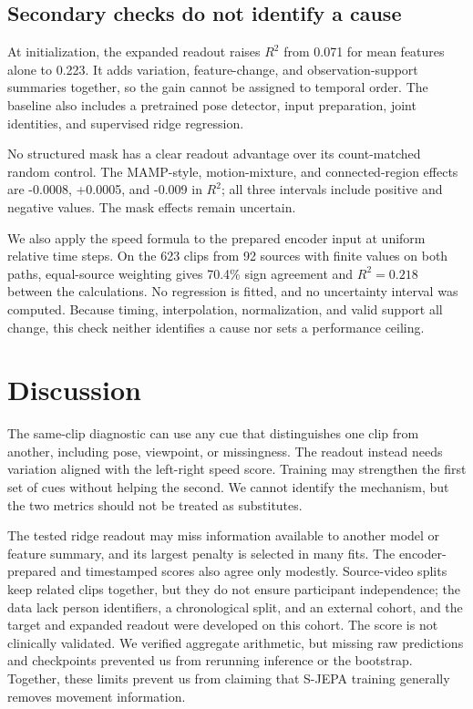 \documentclass{article}
\begin{document}
\subsection{Secondary checks do not identify a
cause}\label{secondary-checks-do-not-identify-a-cause}

At initialization, the expanded readout raises \(R^2\) from 0.071 for
mean features alone to 0.223. It adds variation, feature-change, and
observation-support summaries together, so the gain cannot be assigned
to temporal order. The baseline also includes a pretrained pose
detector, input preparation, joint identities, and supervised ridge
regression.

No structured mask has a clear readout advantage over its count-matched
random control. The MAMP-style, motion-mixture, and connected-region
effects are -0.0008, +0.0005, and -0.009 in \(R^2\); all three intervals
include positive and negative values. The mask effects remain uncertain.

We also apply the speed formula to the prepared encoder input at uniform
relative time steps. On the 623 clips from 92 sources with finite values
on both paths, equal-source weighting gives 70.4\% sign agreement and
\(R^2=0.218\) between the calculations. No regression is fitted, and no
uncertainty interval was computed. Because timing, interpolation,
normalization, and valid support all change, this check neither
identifies a cause nor sets a performance ceiling.

\section{Discussion}\label{discussion}

The same-clip diagnostic can use any cue that distinguishes one clip
from another, including pose, viewpoint, or missingness. The readout
instead needs variation aligned with the left-right speed score.
Training may strengthen the first set of cues without helping the
second. We cannot identify the mechanism, but the two metrics should not
be treated as substitutes.

The tested ridge readout may miss information available to another model
or feature summary, and its largest penalty is selected in many fits.
The encoder-prepared and timestamped scores also agree only modestly.
Source-video splits keep related clips together, but they do not ensure
participant independence; the data lack person identifiers, a
chronological split, and an external cohort, and the target and expanded
readout were developed on this cohort. The score is not clinically
validated. We verified aggregate arithmetic, but missing raw predictions
and checkpoints prevented us from rerunning inference or the bootstrap.
Together, these limits prevent us from claiming that S-JEPA training
generally removes movement information.
\end{document}
